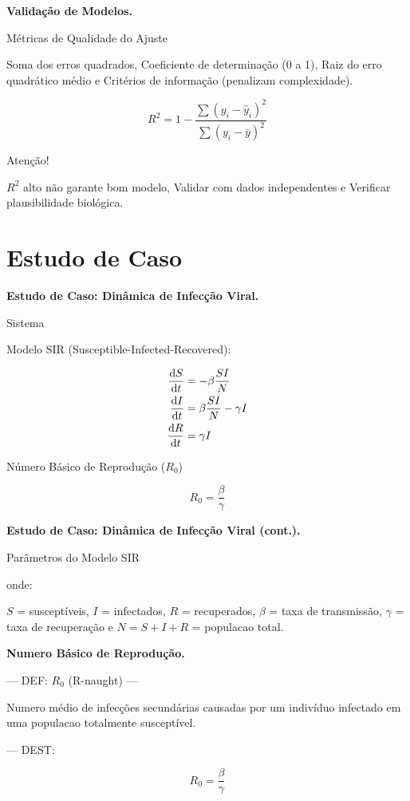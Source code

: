 \textbf{Validação de Modelos.}

Métricas de Qualidade do Ajuste

Soma dos erros quadrados, Coeficiente de determinação (0 a 1), Raiz do erro quadrático médio e Critérios de informação (penalizam complexidade).

%
\begin{equation*}
R^2 = 1 - \frac{\sum (y_i - \hat{y}_i)^2}{\sum (y_i - \bar{y})^2}
\end{equation*}
%

Atenção!

$R^2$ alto não garante bom modelo, Validar com dados independentes e Verificar plausibilidade biológica.

\section{Estudo de Caso}

\textbf{Estudo de Caso: Dinâmica de Infecção Viral.}

Sistema

Modelo SIR (Susceptible-Infected-Recovered):

%
\begin{align*}
\frac{\mathrm{d} S}{\mathrm{d} t} &= -\beta \frac{SI}{N}\\
\frac{\mathrm{d} I}{\mathrm{d} t} &= \beta \frac{SI}{N} - \gamma I\\
\frac{\mathrm{d} R}{\mathrm{d} t} &= \gamma I
\end{align*}
%

Número Básico de Reprodução ($R_0$)

%
\begin{equation*}
R_0 = \frac{\beta}{\gamma}
\end{equation*}
%

\textbf{Estudo de Caso: Dinâmica de Infecção Viral (cont.).}

Parâmetros do Modelo SIR

onde:

$S$ = susceptíveis, $I$ = infectados, $R$ = recuperados, $\beta$ = taxa de transmissão, $\gamma$ = taxa de recuperação e $N = S + I + R$ = populacao total.

\textbf{Numero Básico de Reprodução.}

--- DEF: $R_0$ (R-naught) ---

Numero médio de infecções secundárias causadas por um indivíduo infectado em uma populacao totalmente susceptível.

--- DEST: 

%
\begin{equation*}
R_0 = \frac{\beta}{\gamma}
\end{equation*}
%


